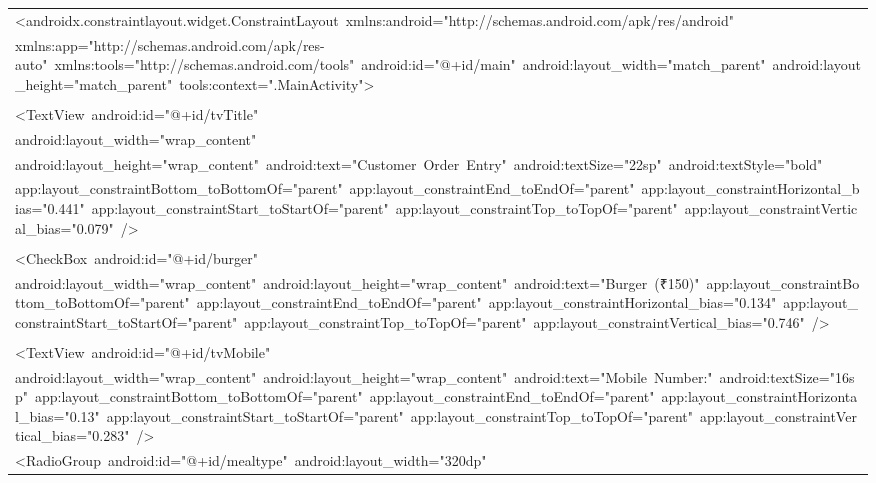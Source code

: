 \documentclass[a4paper,12pt]{article}
\begin{document}
\begin{longtable}{|p{}|}
{\ttfamily\small \textless{}androidx.constraintlayout.widget.ConstraintLayout\ xmlns:android="http://schemas.android.com/apk/res/android"} \\
{\ttfamily\small xmlns:app="http://schemas.android.com/apk/res-auto"\ xmlns:tools="http://schemas.android.com/tools"\ android:id="@+id/main"\ android:layout\_width="match\_parent"\ android:layout\_height="match\_parent"\ tools:context=".MainActivity"\textgreater{}} \\
\strut \\
{\ttfamily\small \textless{}TextView\ android:id="@+id/tvTitle"} \\
{\ttfamily\small android:layout\_width="wrap\_content"} \\
{\ttfamily\small android:layout\_height="wrap\_content"\ android:text="Customer\ Order\ Entry"\ android:textSize="22sp"\ android:textStyle="bold"} \\
{\ttfamily\small app:layout\_constraintBottom\_toBottomOf="parent"\ app:layout\_constraintEnd\_toEndOf="parent"\ app:layout\_constraintHorizontal\_bias="0.441"\ app:layout\_constraintStart\_toStartOf="parent"\ app:layout\_constraintTop\_toTopOf="parent"\ app:layout\_constraintVertical\_bias="0.079"\ /\textgreater{}} \\
\strut \\
{\ttfamily\small \textless{}CheckBox\ android:id="@+id/burger"} \\
{\ttfamily\small android:layout\_width="wrap\_content"\ android:layout\_height="wrap\_content"\ android:text="Burger\ (₹150)"\ app:layout\_constraintBottom\_toBottomOf="parent"\ app:layout\_constraintEnd\_toEndOf="parent"\ app:layout\_constraintHorizontal\_bias="0.134"\ app:layout\_constraintStart\_toStartOf="parent"\ app:layout\_constraintTop\_toTopOf="parent"\ app:layout\_constraintVertical\_bias="0.746"\ /\textgreater{}} \\
\strut \\
{\ttfamily\small \textless{}TextView\ android:id="@+id/tvMobile"} \\
{\ttfamily\small android:layout\_width="wrap\_content"\ android:layout\_height="wrap\_content"\ android:text="Mobile\ Number:"\ android:textSize="16sp"\ app:layout\_constraintBottom\_toBottomOf="parent"\ app:layout\_constraintEnd\_toEndOf="parent"\ app:layout\_constraintHorizontal\_bias="0.13"\ app:layout\_constraintStart\_toStartOf="parent"\ app:layout\_constraintTop\_toTopOf="parent"\ app:layout\_constraintVertical\_bias="0.283"\ /\textgreater{}} \\
{\ttfamily\small \textless{}RadioGroup\ android:id="@+id/mealtype"\ android:layout\_width="320dp"} \\

\end{longtable}
\end{document}
